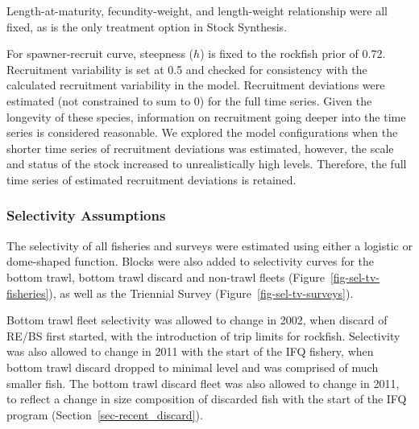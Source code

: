 \documentclass[
]{scrartcl}
\begin{document}
Length-at-maturity, fecundity-weight, and length-weight relationship
were all fixed, as is the only treatment option in Stock Synthesis.

For spawner-recruit curve, steepness (\(h\)) is fixed to the rockfish
prior of 0.72. Recruitment variability is set at 0.5 and checked for
consistency with the calculated recruitment variability in the model.
Recruitment deviations were estimated (not constrained to sum to 0) for
the full time series. Given the longevity of these species, information
on recruitment going deeper into the time series is considered
reasonable. We explored the model configurations when the shorter time
series of recruitment deviations was estimated, however, the scale and
status of the stock increased to unrealistically high levels. Therefore,
the full time series of estimated recruitment deviations is retained.

\subsubsection{Selectivity Assumptions}\label{selectivity-assumptions}

The selectivity of all fisheries and surveys were estimated using either
a logistic or dome-shaped function. Blocks were also added to
selectivity curves for the bottom trawl, bottom trawl discard and
non-trawl fleets (Figure~\ref{fig-sel-tv-fisheries}), as well as the
Triennial Survey (Figure~\ref{fig-sel-tv-surveys}).

Bottom trawl fleet selectivity was allowed to change in 2002, when
discard of RE/BS first started, with the introduction of trip limits for
rockfish. Selectivity was also allowed to change in 2011 with the start
of the IFQ fishery, when bottom trawl discard dropped to minimal level
and was comprised of much smaller fish. The bottom trawl discard fleet
was also allowed to change in 2011, to reflect a change in size
composition of discarded fish with the start of the IFQ program
(Section~\ref{sec-recent_discard}).
\end{document}
